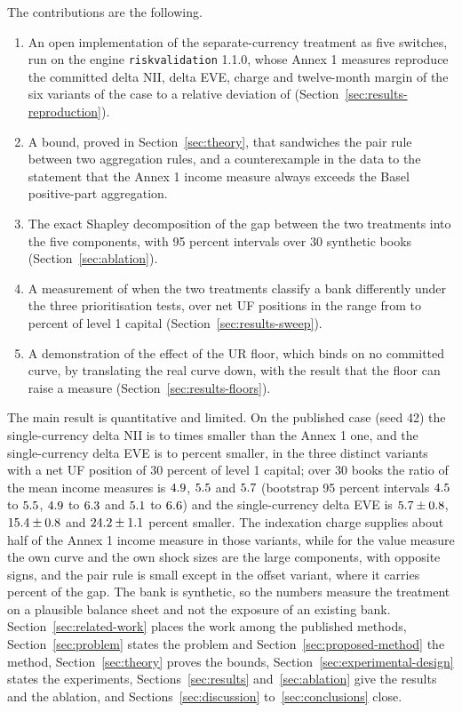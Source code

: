 The contributions are the following.
\begin{enumerate}
\item An open implementation of the separate-currency treatment as five switches, run on the engine \texttt{riskvalidation} 1.1.0, whose Annex 1 measures reproduce the committed delta NII, delta EVE, charge and twelve-month margin of the six variants of the case to a relative deviation of \repMaxDev{} (Section~\ref{sec:results-reproduction}).
\item A bound, proved in Section~\ref{sec:theory}, that sandwiches the pair rule between two aggregation rules, and a counterexample in the data to the statement that the Annex 1 income measure always exceeds the Basel positive-part aggregation.
\item The exact Shapley decomposition of the gap between the two treatments into the five components, with 95 percent intervals over 30 synthetic books (Section~\ref{sec:ablation}).
\item A measurement of when the two treatments classify a bank differently under the three prioritisation tests, over net UF positions in the range from \sweepLo{} to \sweepHi{} percent of level 1 capital (Section~\ref{sec:results-sweep}).
\item A demonstration of the effect of the UR floor, which binds on no committed curve, by translating the real curve down, with the result that the floor can raise a measure (Section~\ref{sec:results-floors}).
\end{enumerate}

The main result is quantitative and limited. On the published case (seed 42) the single-currency delta NII is \repRatioLo{} to \repRatioHi{} times smaller than the Annex 1 one, and the single-currency delta EVE is \repEveShortLo{} to \repEveShortHi{} percent smaller, in the three distinct variants with a net UF position of 30 percent of level 1 capital; over 30 books the ratio of the mean income measures is $4.9$, $5.5$ and $5.7$ (bootstrap 95 percent intervals $4.5$ to $5.5$, $4.9$ to $6.3$ and $5.1$ to $6.6$) and the single-currency delta EVE is $5.7\pm0.8$, $15.4\pm0.8$ and $24.2\pm1.1$ percent smaller. The indexation charge supplies about half of the Annex 1 income measure in those variants, while for the value measure the own curve and the own shock sizes are the large components, with opposite signs, and the pair rule is small except in the offset variant, where it carries \pairShareEveOff{} percent of the gap. The bank is synthetic, so the numbers measure the treatment on a plausible balance sheet and not the exposure of an existing bank. Section~\ref{sec:related-work} places the work among the published methods, Section~\ref{sec:problem} states the problem and Section~\ref{sec:proposed-method} the method, Section~\ref{sec:theory} proves the bounds, Section~\ref{sec:experimental-design} states the experiments, Sections~\ref{sec:results} and~\ref{sec:ablation} give the results and the ablation, and Sections~\ref{sec:discussion} to~\ref{sec:conclusions} close.
